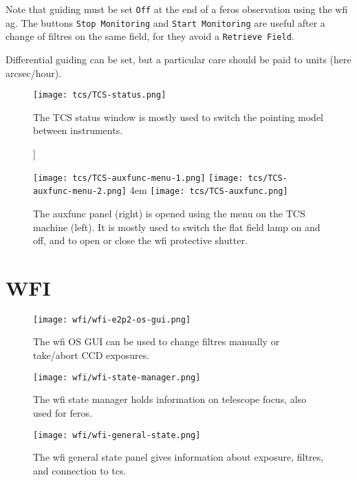 \documentclass[11pt,fleqn]{book} %
\begin{document}
Note that guiding must be set \texttt{Off} at the end of a \gls{feros} observation
using the \gls{wfi} \gls{ag}. The buttons \texttt{Stop Monitoring} and \texttt{Start Monitoring} are
useful after a change of filtres on the same field, for they avoid
a \texttt{Retrieve Field}.

Differential guiding can be set, but a particular care should be paid
to units (here arcsec/hour).


\begin{figure}[!ht]
\centering
\texttt{[image: tcs/TCS-status.png]}
\caption[Status window of the telescope control software]]{The TCS status window is mostly used to switch the pointing model
between instruments.}
\label{fig:tcsstatus}
\end{figure}


\begin{figure}[!ht]
\centering
\texttt{[image: tcs/TCS-auxfunc-menu-1.png]}%
\texttt{[image: tcs/TCS-auxfunc-menu-2.png]}
\hglue 4em
\texttt{[image: tcs/TCS-auxfunc.png]}
\caption[Auxiliary functions of the telescope control software]{The \gls{auxfunc} panel (right) is opened using the menu
on the TCS machine (left). It is mostly used to switch the flat field 
lamp on and off, and to open or close the \gls{wfi} protective shutter.}
\label{fig:tcsauxfunc}
\end{figure}

\section{WFI}

\begin{figure}[!ht]
\centering
\texttt{[image: wfi/wfi-e2p2-os-gui.png]}
\caption[WFI OS GUI]{The \gls{wfi} OS GUI can be used to change filtres manually or
take/abort CCD exposures.}
\label{fig:wfios}
\end{figure}

\begin{figure}[!ht]
\centering
\texttt{[image: wfi/wfi-state-manager.png]}
\caption[WFI state manager]{The \gls{wfi} state manager holds information on telescope
focus, also used for \gls{feros}.}
\label{fig:wfistate}
\end{figure}

\begin{figure}[!ht]
\centering
\texttt{[image: wfi/wfi-general-state.png]}
\caption[WFI general state panel]{The \gls{wfi} general state panel gives information
about exposure, filtres, and connection to \gls{tcs}.}
\label{fig:wfigen}
\end{figure}
\end{document}
